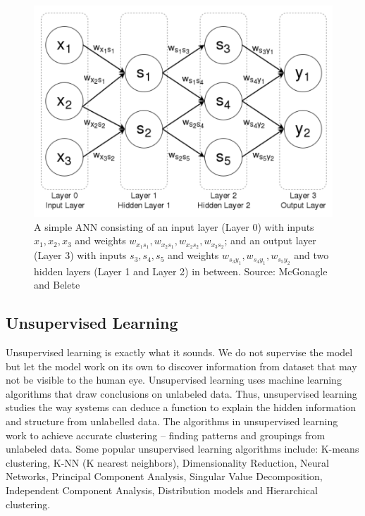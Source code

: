 \documentclass[master]{thesis-uestc}
\begin{document}
\begin{figure}[ht]
\includegraphics[width=5in]{pic/ANN.png}
\caption{A simple ANN consisting of an input layer (Layer 0) with inputs $x_1, x_2, x_3$ and weights $w_{x_1s_1}, w_{x_2s_1}, w_{x_2s_2}, w_{x_3s_2}$; and an output layer (Layer 3) with inputs $s_3, s_4, s_5$ and weights $w_{s_3y_1}, w_{s_4y_1}, w_{s_5y_2}$ and two hidden layers (Layer 1 and Layer 2) in between. Source: McGonagle and Belete\cite{McGonagle}}
\label{fig_ANN}
\end{figure}

\subsection{Unsupervised Learning}
Unsupervised learning is exactly what it sounds. We do not supervise the model but let the model work on its own to discover information from dataset that may not be visible to the human eye. Unsupervised learning uses machine learning algorithms that draw conclusions on unlabeled data. Thus, unsupervised learning studies the way systems can deduce a function to explain the hidden information and structure from unlabelled data. The algorithms in unsupervised learning work to achieve accurate clustering – finding patterns and groupings from unlabeled data. Some popular unsupervised learning algorithms include: K-means clustering, K-NN (K nearest neighbors), Dimensionality Reduction, Neural Networks, Principal Component Analysis, Singular Value Decomposition, Independent Component Analysis, Distribution models and Hierarchical clustering.
\end{document}
